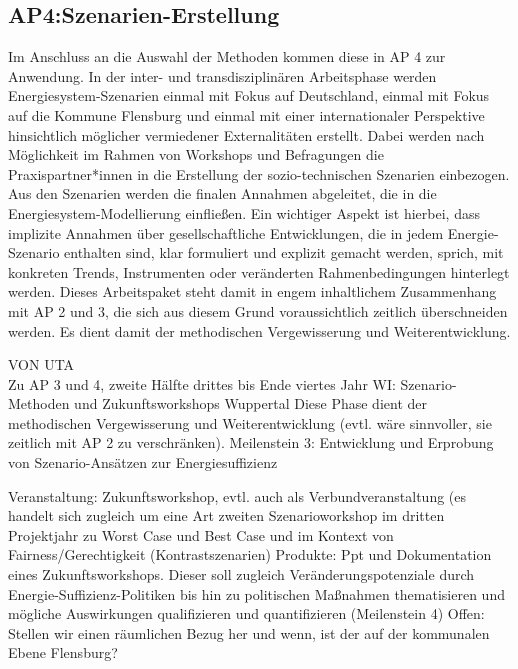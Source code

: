 \documentclass[a4paper,11pt,twoside]{scrartcl}
\begin{document}
\subsection*{AP4:Szenarien-Erstellung}
Im Anschluss an die Auswahl der Methoden kommen diese in AP 4 zur Anwendung. In der inter- und transdisziplinären Arbeitsphase werden Energiesystem-Szenarien einmal mit Fokus auf Deutschland, einmal mit Fokus auf die Kommune Flensburg und einmal mit einer internationaler Perspektive hinsichtlich möglicher vermiedener Externalitäten erstellt. Dabei werden nach Möglichkeit im Rahmen von Workshops und Befragungen die Praxispartner*innen in die Erstellung der sozio-technischen Szenarien einbezogen. Aus den Szenarien werden die finalen Annahmen abgeleitet, die in die Energiesystem-Modellierung einfließen. Ein wichtiger Aspekt ist hierbei, dass implizite Annahmen über gesellschaftliche Entwicklungen, die in jedem Energie-Szenario enthalten sind, klar formuliert und explizit gemacht werden, sprich, mit konkreten Trends, Instrumenten oder veränderten Rahmenbedingungen hinterlegt werden. Dieses Arbeitspaket steht damit in engem inhaltlichem Zusammenhang mit AP 2 und 3, die sich aus diesem Grund voraussichtlich zeitlich überschneiden werden. Es dient damit der methodischen Vergewisserung und Weiterentwicklung.

VON UTA\\
Zu AP 3 und 4, zweite Hälfte drittes bis Ende viertes Jahr WI: Szenario-Methoden und Zukunftsworkshops Wuppertal
Diese Phase dient der methodischen Vergewisserung und Weiterentwicklung (evtl. wäre sinnvoller, sie zeitlich mit AP 2 zu verschränken).
Meilenstein 3: Entwicklung und Erprobung von Szenario-Ansätzen zur Energiesuffizienz

Veranstaltung: Zukunftsworkshop, evtl. auch als Verbundveranstaltung (es handelt sich zugleich um eine Art zweiten Szenarioworkshop im dritten Projektjahr zu Worst Case und Best Case und im Kontext von Fairness/Gerechtigkeit (Kontrastszenarien)
Produkte: Ppt und Dokumentation eines Zukunftsworkshops. Dieser soll zugleich Veränderungspotenziale durch Energie-Suffizienz-Politiken bis hin zu politischen Maßnahmen thematisieren und mögliche Auswirkungen qualifizieren und quantifizieren (Meilenstein 4)
Offen: Stellen wir einen räumlichen Bezug her und wenn, ist der auf der kommunalen Ebene Flensburg?
\end{document}
